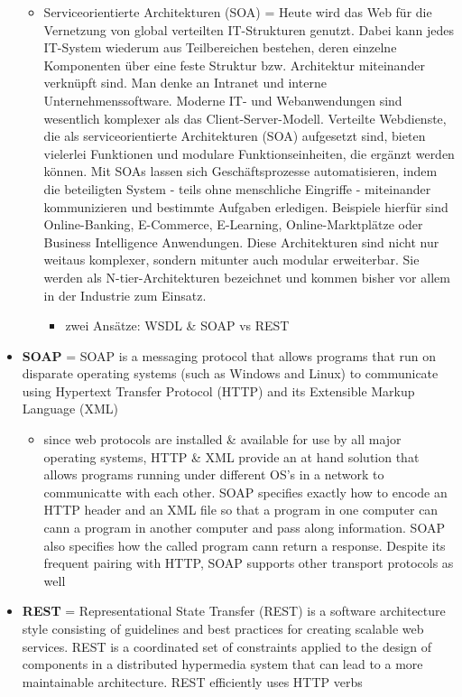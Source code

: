 \documentclass[11pt]{article}
\begin{document}
\begin{itemize}
\begin{itemize}
\item Serviceorientierte Architekturen (SOA) = Heute wird das Web für die Vernetzung von global verteilten IT-Strukturen genutzt. Dabei kann jedes IT-System wiederum aus Teilbereichen bestehen, deren einzelne Komponenten über eine feste Struktur bzw. Architektur miteinander verknüpft sind. Man denke an Intranet und interne Unternehmenssoftware. Moderne IT- und Webanwendungen sind wesentlich komplexer als das Client-Server-Modell. Verteilte Webdienste, die als serviceorientierte Architekturen (SOA) aufgesetzt sind, bieten vielerlei Funktionen und modulare Funktionseinheiten, die ergänzt werden können. Mit SOAs lassen sich Geschäftsprozesse automatisieren, indem die beteiligten System - teils ohne menschliche Eingriffe - miteinander kommunizieren und bestimmte Aufgaben erledigen. Beispiele hierfür sind Online-Banking, E-Commerce, E-Learning, Online-Marktplätze oder Business Intelligence Anwendungen. Diese Architekturen sind nicht nur weitaus komplexer, sondern mitunter auch modular erweiterbar. Sie werden als N-tier-Architekturen bezeichnet und kommen bisher vor allem in der Industrie zum Einsatz.
\begin{itemize}
\item zwei Ansätze: WSDL \& SOAP vs REST
\end{itemize}
\end{itemize}
\item \textbf{SOAP} = SOAP is a messaging protocol that allows programs that run on disparate operating systems (such as Windows and Linux) to communicate using Hypertext Transfer Protocol (HTTP) and its Extensible Markup Language (XML)
\begin{itemize}
\item since web protocols are installed \& available for use by all major operating systems, HTTP \& XML provide an at hand solution that allows programs running under different OS's in a network to communicatte with each other. SOAP specifies exactly how to encode an HTTP header and an XML file so that a program in one computer can cann a program in another computer and pass along information. SOAP also specifies how the called program cann return a response. Despite its frequent pairing with HTTP, SOAP supports other transport protocols as well
\end{itemize}
\item \textbf{REST} = Representational State Transfer (REST) is a software architecture style consisting of guidelines and best practices for creating scalable web services. REST is a coordinated set of constraints applied to the design of components in a distributed hypermedia system that can lead to a more maintainable architecture. REST efficiently uses HTTP verbs
\end{itemize}
\end{document}
